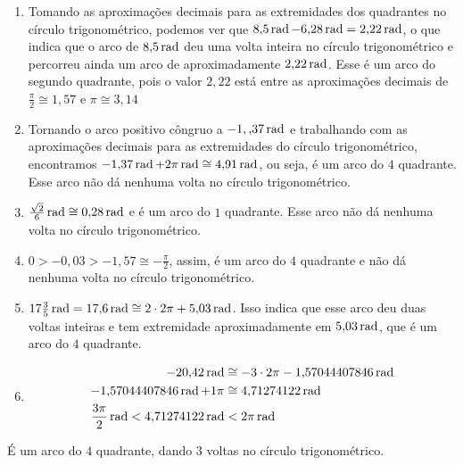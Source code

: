 \documentclass[10 pt,usenames,dvipsnames, oneside]{article}
\begin{document}
\ifdefined\prof
\begin{solucao}

\begin{enumerate}
\item Tomando as aproximações decimais para as extremidades dos quadrantes no círculo trigonométrico, podemos ver que $8{,}5\operatorname{rad} - 6{,}28\operatorname{rad} = 2{,}22\operatorname{rad}$, o que indica que o arco de $8{,}5\operatorname{rad}$ deu uma volta inteira no círculo trigonométrico e percorreu ainda um arco de aproximadamente $2{,}22\operatorname{rad}$. Esse é um arco do segundo quadrante, pois o valor $2{,}22$ está entre as aproximações decimais de $\frac{\pi}{2}\cong1{,}57$ e $\pi\cong3{,}14$
\item Tornando o arco positivo côngruo a $-1,{,}37\operatorname{rad}$ e trabalhando com as aproximações decimais para as extremidades do círculo trigonométrico, encontramos $-1{,}37\operatorname{rad}+2\pi\operatorname{rad} \cong 4{,}91\operatorname{rad}$, ou seja, é um arco do $4$ quadrante. Esse arco não dá nenhuma volta no círculo trigonométrico.
\item $\frac{\sqrt{2}}{6}\operatorname{rad}\cong0{,}28\operatorname{rad}$ e é um arco do $1$ quadrante. Esse arco não dá nenhuma volta no círculo trigonométrico.
\item $0>-0{,}03>-1{,}57\cong-\frac{\pi}{2}$, assim, é um arco do $4$ quadrante e não dá nenhuma volta no círculo trigonométrico.
\item $17\frac{3}{5}\operatorname{rad}=17{,}6\operatorname{rad}\cong2\cdot2\pi+5{,}03\operatorname{rad}$. Isso indica que esse arco deu duas voltas inteiras e tem extremidade aproximadamente em $5{,}03\operatorname{rad}$, que é um arco do $4$ quadrante.
\item 
\begin{align*}
-20{,}42\operatorname{rad}&\cong-3\cdot2\pi-1{,}57044407846\operatorname{rad} \\
-1{,}57044407846\operatorname{rad}+1\pi&\cong4{,}71274122\operatorname{rad}\\
\frac{3\pi}{2}\operatorname{rad}<4{,}71274122\operatorname{rad}&<2\pi\operatorname{rad}
\end{align*}
\end{enumerate}
É um arco do $4$ quadrante, dando $3$ voltas no círculo trigonométrico.
\end{solucao}
\fi
\end{document}
